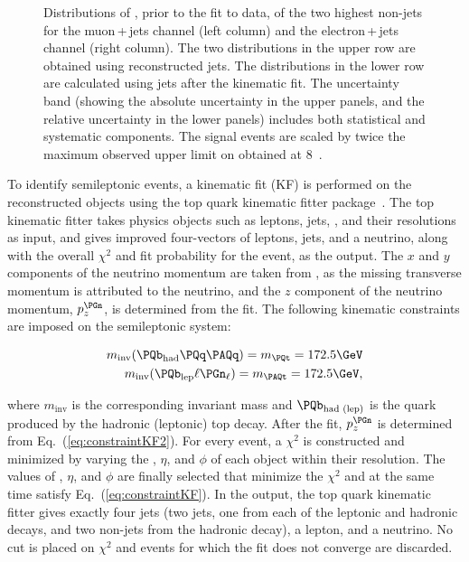 \begin{figure}
    \caption{Distributions of \mjj, prior to the fit to data, of the
        two highest \pt non-\PQb jets for the muon\,+\,jets channel
        (left column) and the electron\,+\,jets channel (right column).
        The two distributions in the upper row are obtained using
        reconstructed jets. The distributions in the lower row are
        calculated using jets after the kinematic fit. 
        The uncertainty band (showing the absolute
        uncertainty in the upper panels, and the relative uncertainty in
        the lower panels) includes both statistical and systematic
        components. The signal events are scaled by twice the maximum
        observed upper limit on \Bthb
        obtained at 8\TeV~\cite{Khachatryan:2015uua}.}
    \label{fig:mjjBTagKinFit}
\end{figure}

To identify semileptonic \ttbar events, a kinematic fit (KF) is
performed on the reconstructed objects using the top quark kinematic
fitter package~\cite{DHondt:926540}. The top kinematic fitter takes
physics objects such as leptons, jets, \ptmiss, and their resolutions
as input, and gives improved four-vectors of leptons, jets, and a
neutrino, along with the overall $\chi^2$ and fit probability for the
event, as the output. The $x$ and $y$ components of the neutrino
momentum are taken from \ptmiss, as the missing transverse momentum
is attributed to the neutrino, and the $z$ component of the neutrino
momentum, $p_z^{\PGn}$, is determined from the fit. The following
kinematic constraints are imposed on the semileptonic \ttbar system:
\begin{linenomath}
\begin{subequations}
\label{eq:constraintKF}
\begin{align}
	m_{\text{inv}}(\PQb_{\text{had}}\PQq\PAQq) = m_{\PQt} = 172.5\GeV
    \label{eq:constraintKF1}\\
	m_{\text{inv}}(\PQb_{\text{lep}}\ell\PGn_\ell) = m_{\PAQt} = 172.5\GeV ,
    \label{eq:constraintKF2}
\end{align}
\end{subequations}
\end{linenomath}
\noindent where $m_{\text{inv}}$ is the corresponding invariant mass
and $\PQb_{\text{had (lep)}}$ is the \PQb quark produced by the
hadronic (leptonic) top decay. After the fit, $p_z^{\PGn}$ is
determined from Eq.~(\ref{eq:constraintKF2}). For every event, a
$\chi^2$ is constructed and minimized by varying the \pt, $\eta$, and
$\phi$ of each object within their resolution. The values of \pt,
$\eta$, and $\phi$ are finally selected that minimize the $\chi^2$ and
at the same time satisfy Eq.~(\ref{eq:constraintKF}). In the output,
the top quark kinematic fitter gives exactly four jets (two \PQb jets,
one from each of the leptonic and hadronic \PQt decays, and two
non-\PQb jets from the hadronic \PQt decay), a lepton, and a
neutrino. No cut is placed on $\chi^2$ and events for which the fit
does not converge are discarded.

